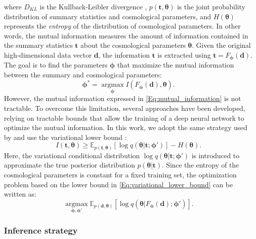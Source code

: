 \documentclass{aa}
\begin{document}
where $D_{KL}$ is the Kullback-Leibler divergence \citep{kullback1951information}, $p(\bm {t}, \bm {\theta})$ is the joint probability distribution of summary statistics and cosmological parameters, and $H(\bm {\theta})$ represents the \textit{entropy} of the distribution of cosmological parameters.  
In other words, the mutual information measures the amount of information contained in the summary statistics $\bm t$ about the cosmological parameters $\bm \theta$.
Given the original high-dimensional data vector $\bm d$, the information $\bm t$ is extracted using $\bm {t}=F_{\bm {\phi}}(\bm {d})$. 
The goal is to find the parameters $\bm {\phi}$ that maximize the mutual information between the summary and cosmological parameters:
\begin{equation}
   \bm {\phi}^*= \operatorname*{argmax}_{\bm {\phi}} I(F_{\bm {\phi}}(\bm{d}), \bm {\theta}).
\end{equation}
However, the mutual information expressed in \autoref{Eq:mutual_information} is not tractable. To overcome this limitation,  several approaches have been developed, relying on tractable bounds that allow the training of a deep neural network to optimize the mutual information. In this work, we adopt the same strategy used by \citet{jeffrey2021likelihood} and use the variational lower bound \citep{barber2003information}:
\begin{equation}\label{Eq:variational_lower_bound}
    I(\bm{t}, \bm{\theta}) \ge \mathbb{E}_{p(\bm {t}, \bm {\theta})} [\log{q(\bm {\theta} |\bm{t} ; \bm{\phi}')}]- H(\bm {\theta}).
\end{equation}
Here, the variational conditional distribution $\log{q(\bm {\theta} |\bm{t} ; \bm{\phi}')}$ is introduced to approximate the true posterior distribution $p(\bm{\theta}|\bm {t})$. 
Since the entropy of the cosmological parameters is constant for a fixed training set, the optimization problem based on the lower bound in  \autoref{Eq:variational_lower_bound} can be written as:
\begin{equation}
    \operatorname*{argmax}_{\bm {\phi}, \bm {\phi}'}\mathbb{E}_{p(\bm {d}, \bm {\theta})} [\log{q(\bm {\theta} |F_{\bm {\phi}}(\bm {d}) ; \bm{\phi}')}].
\end{equation}
\subsubsection{Inference strategy}
\end{document}
